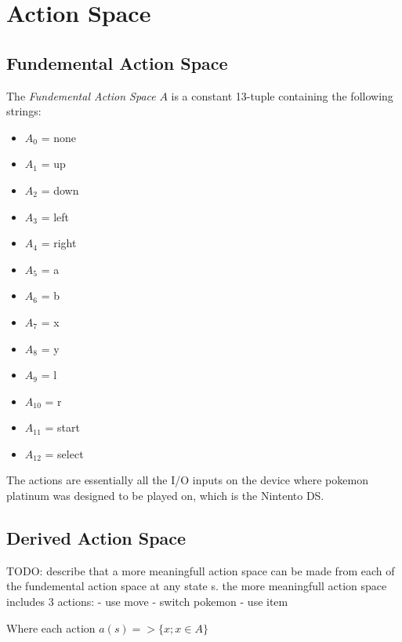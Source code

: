 \section{Action Space}

\subsection{Fundemental Action Space}

The \emph{Fundemental Action Space} $A$ is a constant 13-tuple containing the following strings:
\begin{itemize}
    \item $A_{0}$  = none
    \item $A_{1}$  = up
    \item $A_{2}$  = down
    \item $A_{3}$  = left
    \item $A_{4}$  = right
    \item $A_{5}$  = a
    \item $A_{6}$  = b
    \item $A_{7}$  = x
    \item $A_{8}$  = y
    \item $A_{9}$  = l
    \item $A_{10}$ = r
    \item $A_{11}$ = start
    \item $A_{12}$ = select
\end{itemize}

The actions are essentially all the I/O inputs on the device where pokemon platinum was designed to be played on, which is the Nintento DS.

\subsection{Derived Action Space}

TODO: describe that a more meaningfull action space can be made from each of the fundemental action space at any state s. the more meaningfull action space includes 3 actions:
- use move
- switch pokemon
- use item

Where each action $a(s) => \{ x; x \in A \}$